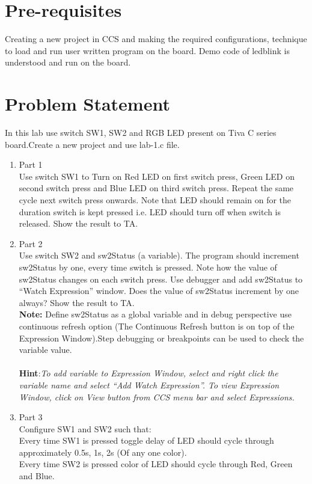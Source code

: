 \documentclass[a4paper,12pt,oneside]{book}
\begin{document}
\section{Pre-requisites}
Creating a new project in CCS and making the required configurations, technique to load and run user written program on the board. Demo code of ledblink is understood and run on the board.
\section{Problem Statement}
In this lab use switch SW1, SW2 and RGB LED present on Tiva C series board.Create a new project and use lab-1.c file.
\begin{enumerate}
\item Part 1\\
Use switch SW1 to Turn on Red LED on first switch press, Green LED on second switch
press and Blue LED on third switch press. Repeat the same cycle next switch press onwards.
Note that LED should remain on for the duration switch is kept pressed i.e. LED should turn
off when switch is released. Show the result to TA.
\item Part 2\\
Use switch SW2 and sw2Status (a variable). The program should increment sw2Status by
one, every time switch is pressed. Note how the value of sw2Status changes on each switch press.
Use debugger and add sw2Status to “Watch Expression” window. Does the value of
sw2Status increment by one always?  Show the result to TA.
\\\textbf{Note:} Define sw2Status as a global variable and in debug perspective use continuous refresh option
(The Continuous Refresh button is on top of the Expression Window).Step debugging
or breakpoints can be used to check the variable value.
\\
\\
\textbf{Hint}:\textit{To add variable to Expression Window, select and right click the variable name and select “Add
Watch Expression”. To view Expression Window, click on View button from CCS menu bar and
select Expressions.}
\item Part 3\\
Configure SW1 and SW2 such that:
\\
\hspace{2mm}Every time SW1 is pressed toggle delay of LED should cycle through
approximately 0.5s, 1s, 2s (Of any one color).
\\
\hspace{2mm}Every time SW2 is pressed color of LED should cycle through Red, Green
and Blue.
\end{enumerate}
 
\end{document}
